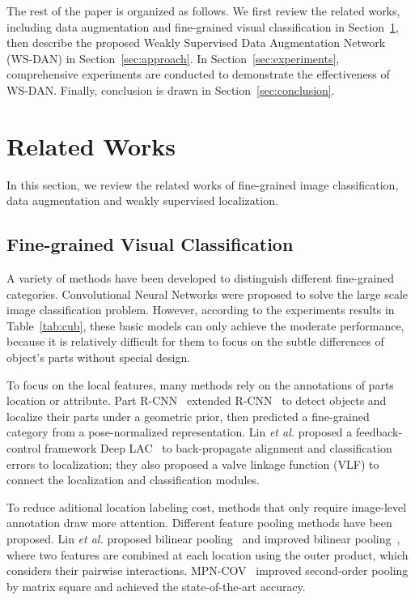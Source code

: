 \documentclass[10pt,twocolumn,letterpaper]{article}
\def\etal{{\em et al. }}
\begin{document}
The rest of the paper is organized as follows. We first review the related works, including data augmentation and fine-grained visual classification in Section~\ref{sec:related_work}, then describe the proposed Weakly Supervised Data Augmentation Network (WS-DAN) in Section~\ref{sec:approach}. In Section~\ref{sec:experiments}, comprehensive experiments are conducted to demonstrate the effectiveness of WS-DAN. Finally, conclusion is drawn in Section~\ref{sec:conclusion}.



\section{Related Works}
\label{sec:related_work}
In this section, we review the related works of fine-grained image classification, data augmentation and weakly supervised localization.

\subsection{Fine-grained Visual Classification}
A variety of methods have been developed to distinguish different fine-grained categories. Convolutional Neural Networks were proposed to solve the large scale image classification problem. However, according to the experiments results in Table~\ref{tab:cub}, these basic models can only achieve the moderate performance, because it is relatively difficult for them to focus on the subtle differences of object's parts without special design.

To focus on the local features, many methods rely on the annotations of parts location or attribute. Part R-CNN~\cite{Part-rcnn}  extended R-CNN~\cite{rcnn} to detect objects and localize their parts under a geometric prior, then predicted a fine-grained category from a pose-normalized representation.  Lin \etal proposed a feedback-control framework Deep LAC~\cite{deeplac} to back-propagate alignment and classification errors to localization; they also proposed a valve linkage function (VLF) to connect the localization and classification modules.

To reduce aditional location labeling cost, methods that only require image-level annotation draw more attention. Different feature pooling methods have been proposed. Lin \etal proposed bilinear pooling~\cite{bcnn} and improved bilinear pooling~\cite{improved_bcnn}, where two features are combined at each location using the outer product, which considers their pairwise interactions. MPN-COV~\cite{mpn-cov} improved second-order pooling by matrix square and achieved the state-of-the-art accuracy.
\end{document}
